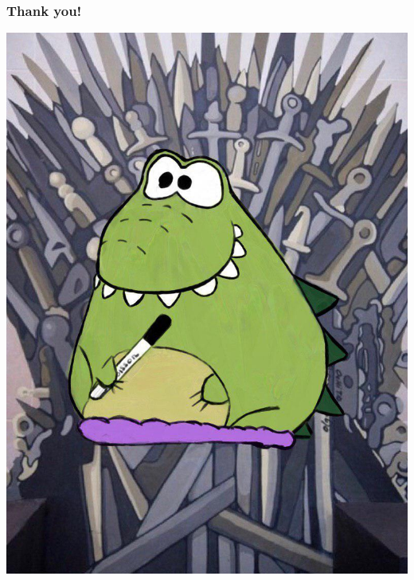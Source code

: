 \begin{frame}
\frametitle{Thank you!}

\begin{center}
\includegraphics[width = 0.5\linewidth]{slides/poiss.jpg}
\end{center}
\end{frame}